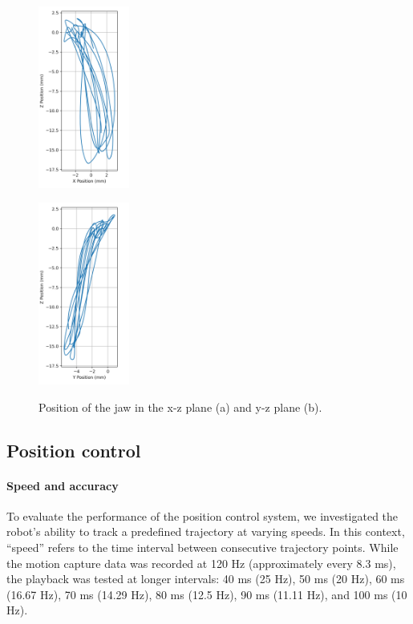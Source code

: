 \begin{figure}[H]
\centering
\begin{minipage}{.45\textwidth}
  \centering
  \includegraphics[height=6cm]{figures/x_vs_z_position.png}
  \subcaption{}
  \label{fig:x-z}
\end{minipage}
\begin{minipage}{.45\textwidth}
  \centering
  \includegraphics[height=6cm]{figures/y_vs_z_position.png}
  \subcaption{}
  \label{fig:y-z}
\end{minipage}
\caption{Position of the jaw in the x-z plane (a) and y-z plane (b).}
\label{fig:xy-z}
\end{figure}


\subsection{Position control}

\paragraph{Speed and accuracy}
To evaluate the performance of the position control system, we investigated the robot's ability to track a predefined trajectory at varying speeds. 
In this context, “speed” refers to the time interval between consecutive trajectory points. While the motion capture data was recorded at 120 Hz 
(approximately every 8.3 ms), the playback was tested at longer intervals: 40 ms (25 Hz), 50 ms (20 Hz), 60 ms (16.67 Hz), 70 ms (14.29 Hz), 80 ms 
(12.5 Hz), 90 ms (11.11 Hz), and 100 ms (10 Hz).

